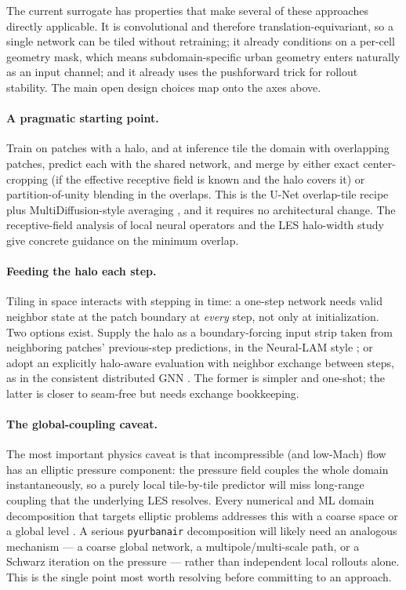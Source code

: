 \documentclass[11pt]{article}
\begin{document}
The current surrogate has properties that make several of these approaches
directly applicable. It is convolutional and therefore translation-equivariant,
so a single network can be tiled without retraining; it already conditions on a
per-cell geometry mask, which means subdomain-specific urban geometry enters
naturally as an input channel; and it already uses the pushforward trick for
rollout stability. The main open design choices map onto the axes above.

\paragraph{A pragmatic starting point.} Train on patches with a halo, and at
inference tile the domain with overlapping patches, predict each with the shared
network, and merge by either exact center-cropping (if the effective receptive
field is known and the halo covers it) or partition-of-unity blending in the
overlaps. This is the U-Net overlap-tile recipe \cite{ronneberger2015unet} plus
MultiDiffusion-style averaging \cite{bartal2023multidiffusion}, and it requires
no architectural change. The receptive-field analysis of local neural operators
\cite{ye2024lno} and the LES halo-width study give concrete guidance on the
minimum overlap.

\paragraph{Feeding the halo each step.} Tiling in space interacts with stepping
in time: a one-step network needs valid neighbor state at the patch boundary at
\emph{every} step, not only at initialization. Two options exist. Supply the halo
as a boundary-forcing input strip taken from neighboring patches' previous-step
predictions, in the Neural-LAM style \cite{oskarsson2023neurallam}; or adopt an
explicitly halo-aware evaluation with neighbor exchange between steps, as in the
consistent distributed GNN \cite{barwey2024consistentgnn}. The former is simpler
and one-shot; the latter is closer to seam-free but needs exchange bookkeeping.

\paragraph{The global-coupling caveat.} The most important physics caveat is that
incompressible (and low-Mach) flow has an elliptic pressure component: the
pressure field couples the whole domain instantaneously, so a purely local
tile-by-tile predictor will miss long-range coupling that the underlying LES
resolves. Every numerical and ML domain decomposition that targets elliptic
problems addresses this with a coarse space or a global level
\cite{dryja1994smalloverlap,dolean2024multilevel,li2020mgno}. A serious
\texttt{pyurbanair} decomposition will likely need an analogous mechanism --- a
coarse global network, a multipole/multi-scale path, or a Schwarz iteration on
the pressure --- rather than independent local rollouts alone. This is the single
point most worth resolving before committing to an approach.
\end{document}
